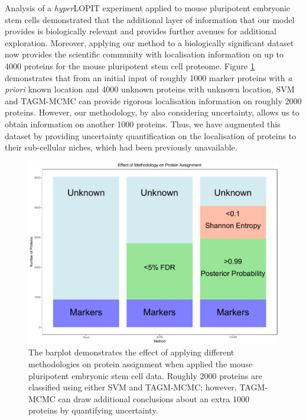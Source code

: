 \documentclass[12pt,english]{article}\usepackage[]{graphicx}\usepackage[]{color}
\begin{document}
Analysis of a \textit{hyper}LOPIT experiment applied to mouse
pluripotent embryonic stem cells demonstrated that the additional
layer of information that our model provides is biologically relevant
and provides further avenues for additional exploration. Moreover,
applying our method to a biologically significant dataset now provides
the scientific community with localisation information on up to 4000
proteins for the mouse pluripotent stem cell proteome. Figure
\ref{figure:ConcludePlot} demonstrates that from an initial input of
roughly 1000 marker proteins with \textit{a priori} known location and
4000 unknown proteins with unknown location, SVM and TAGM-MCMC can
provide rigorous localisation information on roughly 2000
proteins. However, our methodology, by also considering uncertainty,
allows us to obtain information on another 1000 proteins. Thus, we
have augmented this dataset by providing uncertainty quantification on
the localisation of proteins to their sub-cellular niches, which had
been previously unavailable.
{}

\begin{figure}[p]

\centering
\includegraphics[width=.7\textwidth]{ConcludePlot.pdf}
\caption{The barplot demonstrates the effect of applying different
  methodologies on protein assignment when applied the mouse
  pluripotent embryonic stem cell data. Roughly 2000 proteins are
  classified using either SVM and TAGM-MCMC; however, TAGM-MCMC can
  draw additional conclusions about an extra 1000 proteins by
  quantifying uncertainty.}
\label{figure:ConcludePlot}
\end{figure}
\end{document}
